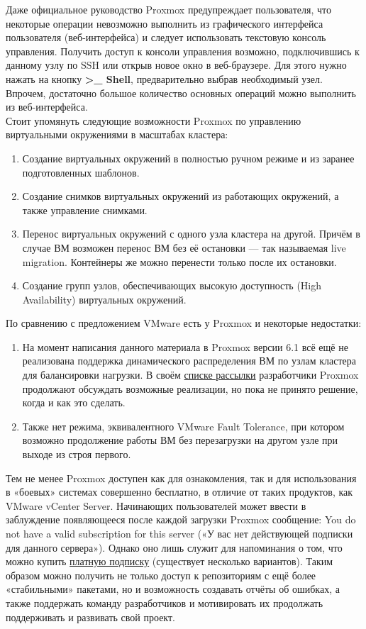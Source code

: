 \documentclass[14pt, a4paper]{article}
\begin{document}
Даже официальное руководство Proxmox предупреждает пользователя, что некоторые операции
невозможно выполнить из графического интерфейса пользователя (веб-интерфейса) и следует
использовать текстовую консоль управления. Получить доступ к консоли управления возможно,
подключившись к данному узлу по SSH или открыв новое окно в веб-браузере. Для этого нужно
нажать на кнопку \textbf{>\_ Shell}, предварительно выбрав необходимый узел. Впрочем, достаточно большое
количество основных операций можно выполнить из веб-интерфейса.\\

Стоит упомянуть следующие возможности Proxmox по управлению виртуальными окружениями в
масштабах кластера:
\begin{enumerate}
    \item Создание виртуальных окружений в полностью ручном режиме и из заранее подготовленных
    шаблонов.
    \item Создание снимков виртуальных окружений из работающих окружений, а также управление
    снимками.
    \item Перенос виртуальных окружений с одного узла кластера на другой. Причём в случае ВМ
    возможен перенос ВМ без её остановки — так называемая live migration. Контейнеры же
    можно перенести только после их остановки.
    \item Создание групп узлов, обеспечивающих высокую доступность (High Availability) виртуальных
    окружений.
\end{enumerate}

По сравнению с предложением VMware есть у Proxmox и некоторые недостатки:
\begin{enumerate}
    \item На момент написания данного материала в Proxmox версии 6.1 всё ещё не реализована
    поддержка динамического распределения ВМ по узлам кластера для балансировки нагрузки.
    В своём \href{https://lists.proxmox.com/pipermail/pve-devel/2019-May/037173.html}{списке рассылки} разработчики Proxmox продолжают обсуждать возможные
    реализации, но пока не принято решение, когда и как это сделать.
    \item Также нет режима, эквивалентного VMware Fault Tolerance, при котором возможно
    продолжение работы ВМ без перезагрузки на другом узле при выходе из строя первого.
\end{enumerate}

Тем не менее Proxmox доступен как для ознакомления, так и для использования в «боевых» системах
совершенно бесплатно, в отличие от таких продуктов, как VMware vCenter Server. Начинающих
пользователей может ввести в заблуждение появляющееся после каждой загрузки Proxmox
сообщение: You do not have a valid subscription for this server («У вас нет действующей подписки для
данного сервера»). Однако оно лишь служит для напоминания о том, что можно купить \href{https://pve.proxmox.com/wiki/Subscriptions}{платную
подписку} (существует несколько вариантов). Таким образом можно получить не только доступ к
репозиториям с ещё более «стабильными» пакетами, но и возможность создавать отчёты об ошибках,
а также поддержать команду разработчиков и мотивировать их продолжать поддерживать и развивать
свой проект.
\end{document}
